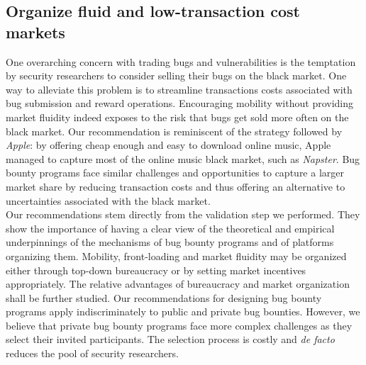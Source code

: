 \subsection{Organize fluid and low-transaction cost markets}
One overarching concern with trading bugs and vulnerabilities is the temptation by security researchers to consider selling their bugs on the black market. One way to alleviate this problem is to streamline transactions costs associated with bug submission and reward operations. Encouraging mobility without providing market fluidity indeed exposes to the risk that bugs get sold more often on the black market. Our recommendation is reminiscent of the strategy followed by {\it Apple}: by offering cheap enough and easy to download online music, Apple managed to capture most of the online music black market, such as {\it Napster}. Bug bounty programs face similar challenges and opportunities to capture a larger market share by reducing transaction costs and thus offering an alternative to uncertainties associated with the black market.\\


Our recommendations stem directly from the validation step we performed. They show the importance of having a clear view of the theoretical and empirical underpinnings of the mechanisms of bug bounty programs and of platforms organizing them. Mobility, front-loading and market fluidity may be organized either through top-down bureaucracy or by setting market incentives appropriately. The relative advantages of bureaucracy and market organization shall be further studied. Our recommendations for designing bug bounty programs apply indiscriminately to public and private bug bounties. However, we believe that private bug bounty programs face more complex challenges as they select their invited participants. The selection process is costly and {\it de facto} reduces the pool of security researchers.\\




